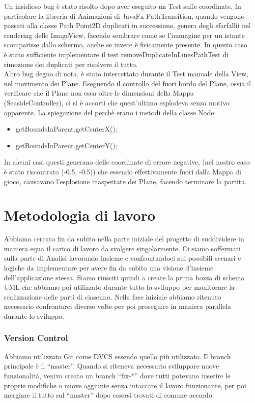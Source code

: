 \documentclass[a4paper,12pt]{report}
\begin{document}
\noindent Un insidioso bug è stato risolto dopo aver eseguito un Test sulle coordinate.
In particolare la libreria di Animazioni di JavaFx PathTransition, quando vengono passati alla 
classe Path Point2D duplicati in successione, genera degli sfarfallii nel rendering delle ImageView, facendo sembrare come se l’immagine per un istante scomparisse dallo schermo, anche se invece è fisicamente presente.
In questo caso è stato sufficiente implementare il test removeDuplicateInLinesPathTest
di rimozione dei duplicati per risolvere il tutto.
\\
Altro bug degno di nota, è stato intercettato durante il Test manuale della View, nel movimento dei Plane.
Eseguendo il controllo del fuori bordo del Plane, ossia il verificare che il Plane non esca oltre le dimensioni della 
Mappa (SeasideController), ci si è accorti che quest’ultimo esplodeva senza motivo apparente.
La spiegazione del perchè erano i metodi della classe Node:
\begin{itemize}
    \item getBoundsInParent.getCenterX();
    \item getBoundsInParent.getCenterY();
\end{itemize}

\noindent In alcuni casi questi generano delle coordinate di errore negative, (nel nostro caso è stato riscontrato 
(-0.5, -0.5)) che essendo effettivamente fuori dalla Mappa di gioco, causavano l’esplosione inaspettate dei Plane, facendo terminare la partita.

\section{Metodologia di lavoro}
Abbiamo cercato fin da subito nella parte iniziale del progetto di suddividere in maniera equa il carico di lavoro da svolgere singolarmente.
Ci siamo soffermati sulla parte di Analisi lavorando insieme e confrontandoci sui possibili scenari e logiche da implementare per avere fin da subito una visione d’insieme dell’applicazione stessa.
Siamo riusciti quindi a creare la prima bozza di schema UML che abbiamo poi utilizzato durante tutto lo sviluppo per monitorare la realizzazione delle parti di ciascuno.
Nella fase iniziale abbiamo ritenuto necessario confrontarci diverse volte per poi proseguire in maniera parallela durante lo sviluppo.

\subsubsection{Version Control}
Abbiamo utilizzato Git come DVCS essendo quello più utilizzato.
Il branch principale è il “master”.
Quando si riteneva necessario sviluppare nuove funzionalità, veniva creato un branch “fix-*” dove tutti potevano inserire le proprie modifiche o nuove aggiunte senza intaccare il lavoro funzionante, per poi mergiare il tutto sul “master” dopo essersi trovati di comune accordo.
\end{document}
